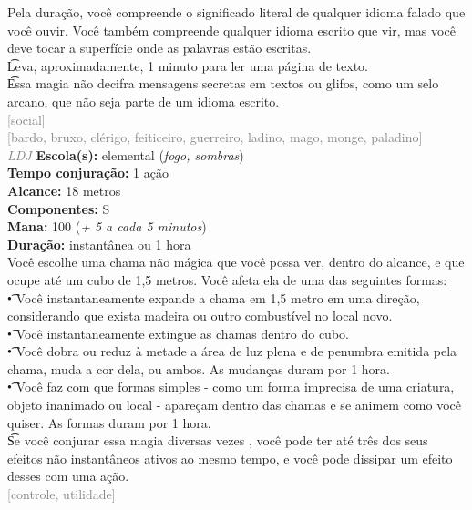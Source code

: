 \documentclass{RPG_Adventure}[2021/10/20]
\begin{document}
{\normalsize Pela duração, você compreende o significado literal de qualquer idioma falado que você ouvir. Você também compreende qualquer idioma escrito que vir, mas você deve tocar a superfície onde as palavras estão escritas.\\\t Leva, aproximadamente, 1 minuto para ler uma página de texto.\\\t Essa magia não decifra mensagens secretas em textos ou glifos, como um selo arcano, que não seja parte de um idioma escrito.\\}
{\scriptsize \textcolor{gray}{[social]\\}}
{\scriptsize \textcolor{gray}{[bardo, bruxo, clérigo, feiticeiro, guerreiro, ladino, mago, monge, paladino]\\}}
{\tiny \textcolor{gray}{\textit{LDJ}}}
{\small \t \textbf{Escola(s):} elemental (\textit{fogo, sombras})\\\t \textbf{Tempo conjuração:} 1 ação\\\t \textbf{Alcance:} 18 metros\\\t \textbf{Componentes:} S\\\t \textbf{Mana:} 100 (\textit{+ 5 a cada 5 minutos})\\\t \textbf{Duração:} instantânea ou 1 hora\\}
{\normalsize Você escolhe uma chama não mágica que você possa ver, dentro do alcance, e que ocupe até um cubo de 1,5 metros. Você afeta ela de uma das seguintes formas:\\\t • Você instantaneamente expande a chama em 1,5 metro em uma direção, considerando que exista madeira ou outro combustível no local novo.\\\t • Você instantaneamente extingue as chamas dentro do cubo.\\\t • Você dobra ou reduz à metade a área de luz plena e de penumbra emitida pela chama, muda a cor dela, ou ambos. As mudanças duram por 1 hora.\\\t • Você faz com que formas simples - como um forma imprecisa de uma criatura, objeto inanimado ou local - apareçam dentro das chamas e se animem como você quiser. As formas duram por 1 hora.\\\t Se você conjurar essa magia diversas vezes , você pode ter até três dos seus efeitos não instantâneos ativos ao mesmo tempo, e você pode dissipar um efeito desses com uma ação.\\}
{\scriptsize \textcolor{gray}{[controle, utilidade]\\}}
\end{document}
